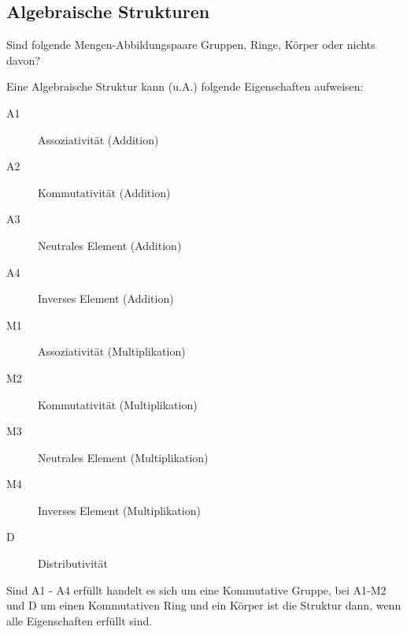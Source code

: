 \documentclass[11pt, a4paper]{article}
\begin{document}
\subsection{Algebraische Strukturen}
Sind folgende Mengen-Abbildungspaare Gruppen, Ringe, Körper oder nichts davon?

Eine Algebraische Struktur kann (u.A.) folgende Eigenschaften aufweisen:
\begin{description}
	\item[A1] Assoziativität (Addition)
	\item[A2] Kommutativität (Addition)
	\item[A3] Neutrales Element (Addition)
	\item[A4] Inverses Element (Addition)
	\item[M1] Assoziativität (Multiplikation)
	\item[M2] Kommutativität (Multiplikation)
	\item[M3] Neutrales Element (Multiplikation)
	\item[M4] Inverses Element (Multiplikation)
	\item[D] Distributivität
\end{description}
Sind A1 - A4 erfüllt handelt es sich um eine Kommutative Gruppe, bei A1-M2 und D um einen Kommutativen Ring und ein Körper ist die Struktur dann, wenn alle Eigenschaften erfüllt sind.
\end{document}

